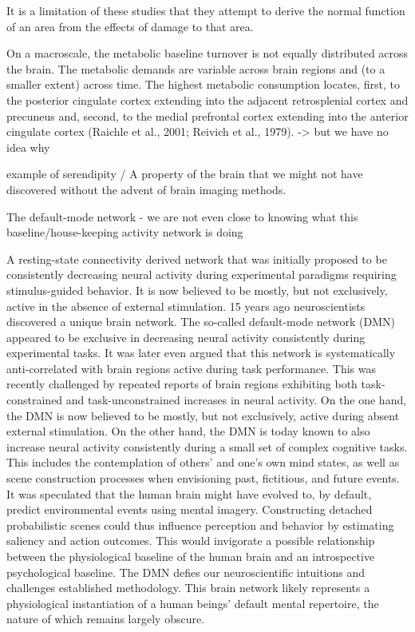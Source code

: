 \documentclass[authoryear,review,3p]{elsarticle}
\begin{document}
It is a limitation of these studies that they attempt to derive the normal function of an area from the effects of damage to that area.

On a macroscale, the metabolic baseline turnover is not equally distributed across the brain. The metabolic demands are variable across brain regions and (to a smaller extent) across time. The highest metabolic consumption locates, first, to the posterior cingulate cortex extending into the adjacent retrosplenial cortex and precuneus and, second, to the medial prefrontal cortex extending into the anterior cingulate cortex (Raichle et al., 2001; Reivich et al., 1979).
-> but we have no idea why


example of serendipity / A property of the brain that we might not have
discovered without the advent of brain imaging methods.

The default-mode network - we are not even close to knowing
what this baseline/house-keeping activity network is doing

A resting-state connectivity derived network that was initially proposed to be consistently decreasing neural activity during experimental paradigms requiring stimulus-guided behavior. It is now believed to be mostly, but not exclusively, active in the absence of external stimulation. 
15 years ago neuroscientists discovered a unique brain network. The so-called default-mode network (DMN) appeared to be exclusive in decreasing neural activity consistently during experimental tasks.
It was later even argued that this network is systematically anti-correlated with brain regions active during task performance. This was recently challenged by repeated reports of brain regions exhibiting both task-constrained and task-unconstrained increases in neural activity. On the one hand, the DMN is now believed to be mostly, but not exclusively, active during absent external stimulation. On the other hand, the DMN is today known to also increase neural activity consistently during a small set of complex cognitive tasks. This includes the contemplation of others’ and one’s own mind states, as well as scene construction processes when envisioning past, fictitious, and future events. It was speculated that the human brain might have evolved to, by default, predict environmental events using mental imagery. Constructing detached probabilistic scenes could thus influence perception and behavior by estimating saliency and action outcomes. This would invigorate a possible relationship between the physiological baseline of the human brain and an introspective psychological baseline.
The DMN defies our neuroscientific intuitions and challenges established methodology. This brain network likely represents a physiological instantiation of a human beings' default mental repertoire, the nature of which remains largely obscure.
\end{document}
